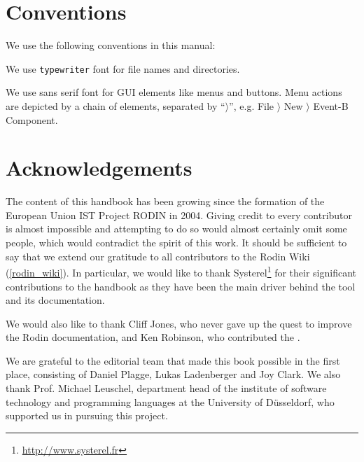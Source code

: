 \documentclass[12pt]{book}
\begin{document}
\section{Conventions}
\label{conventions}

We use the following conventions in this manual:


We use \texttt{typewriter} font for file names and directories.

We use \textsf{sans serif font} for GUI elements like menus and buttons.  Menu actions are depicted by a chain of elements, separated by ``$\rangle$'', e.g. \textsf{File $\rangle$ New $\rangle$ Event-B Component}.

\section{Acknowledgements}
\label{sec:acknowledgements}

The content of this handbook has been growing since the formation of the European Union IST Project RODIN in 2004.  Giving credit to every contributor is almost impossible and attempting to do so would almost certainly omit some people, which would contradict the spirit of this work.  It should be sufficient to say that we extend our gratitude to all contributors to the Rodin Wiki (\ref{rodin_wiki}). In particular, we would like to thank Systerel\footnote{\url{http://www.systerel.fr}} for their significant contributions to the handbook as they have been the main driver behind the tool and its documentation.

We would also like to thank Cliff Jones, who never gave up the quest to improve the Rodin documentation, and Ken Robinson, who contributed the .

We are grateful to the editorial team that made this book possible in the first place, consisting of Daniel Plagge, Lukas Ladenberger and Joy Clark.  We also thank Prof. Michael Leuschel, department head of the institute of software technology and programming languages at the University of Düsseldorf, who supported us in pursuing this project.
\end{document}
